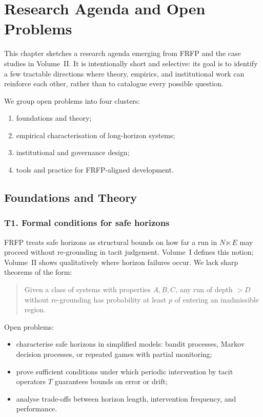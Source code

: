 \chapter{Research Agenda and Open Problems}
\label{ch:frfp-open-problems}

This chapter sketches a research agenda emerging from FRFP and the
case studies in Volume~II.
It is intentionally short and selective:
its goal is to identify a few tractable directions where theory,
empirics, and institutional work can reinforce each other, rather
than to catalogue every possible question.

We group open problems into four clusters:

\begin{enumerate}
  \item foundations and theory;
  \item empirical characterisation of long-horizon systems;
  \item institutional and governance design;
  \item tools and practice for FRFP-aligned development.
\end{enumerate}

\section{Foundations and Theory}

\subsection{T1. Formal conditions for safe horizons}

FRFP treats safe horizons as structural bounds on how far a run in
\(N \ltimes E\) may proceed without re-grounding in tacit judgement.
Volume~I defines this notion; Volume~II shows qualitatively where
horizon failures occur.
We lack sharp theorems of the form:

\begin{quote}
  Given a class of systems with properties \(A,B,C\), any run of
  depth \(>D\) without re-grounding has probability at least \(p\) of
  entering an inadmissible region.
\end{quote}

Open problems:

\begin{itemize}
  \item characterise safe horizons in simplified models:
        bandit processes, Markov decision processes, or repeated
        games with partial monitoring;
  \item prove sufficient conditions under which periodic intervention
        by tacit operators \(T\) guarantees bounds on error or drift;
  \item analyse trade-offs between horizon length, intervention
        frequency, and performance.
\end{itemize}

